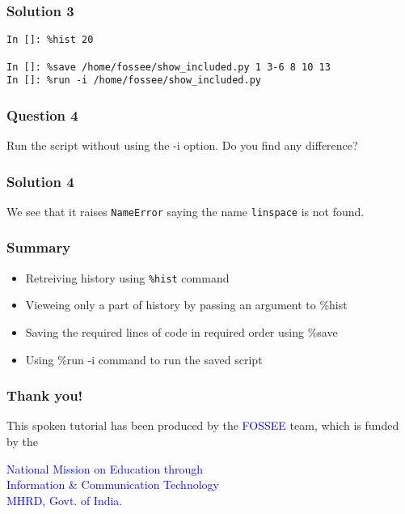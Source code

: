 \documentclass[presentation]{beamer}
\begin{document}
\begin{frame}[fragile]
\frametitle{Solution 3}
\label{sec-7}

\lstset{language=Python}
\begin{lstlisting}
In []: %hist 20

In []: %save /home/fossee/show_included.py 1 3-6 8 10 13
In []: %run -i /home/fossee/show_included.py
\end{lstlisting}
\end{frame}
\begin{frame}
\frametitle{Question 4}
\label{sec-8}

  Run the script without using the -i option. Do you find any
  difference?
\end{frame}
\begin{frame}
\frametitle{Solution 4}
\label{sec-9}

  We see that it raises \texttt{NameError} saying the name \texttt{linspace} is not
  found.
\end{frame}
\begin{frame}
\frametitle{Summary}
\label{sec-10}

\begin{itemize}
\item Retreiving history using \texttt{\%hist} command
\item Vieweing only a part of history by passing an argument to \%hist
\item Saving the required lines of code in required order using \%save
\item Using \%run -i command to run the saved script
\end{itemize}
\end{frame}
\begin{frame}
\frametitle{Thank you!}
\label{sec-11}

  \begin{block}{}
  \begin{center}
  This spoken tutorial has been produced by the
  \textcolor{blue}{FOSSEE} team, which is funded by the 
  \end{center}
  \begin{center}
    \textcolor{blue}{National Mission on Education through \\
      Information \& Communication Technology \\ 
      MHRD, Govt. of India}.
  \end{center}  
  \end{block}
\end{frame}
\end{document}
